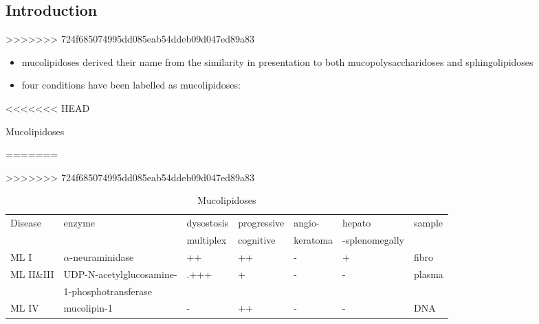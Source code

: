 \documentclass[fontsize=12pt]{scrartcl}
\begin{document}
\begin{enumerate}
\begin{enumerate}
\begin{enumerate}
\begin{enumerate}
\begin{table}[htbp]
\begin{enumerate}
\begin{enumerate}
\begin{enumerate}
\begin{enumerate}
\subsection{Introduction}
\label{sec:org13ec7d0}
>>>>>>> 724f685074995dd085eab54ddeb09d047ed89a83
\begin{itemize}
\item mucolipidoses derived their name from the similarity in
presentation to both mucopolysaccharidoses and sphingolipidoses
\item four conditions have been labelled as mucolipidoses:
\end{itemize}

\begin{table}[htbp]
<<<<<<< HEAD
\caption{\label{tab:org19ff6d4}Mucolipidoses}
=======
\caption{\label{tab:org76f8d5f}
Mucolipidoses}
>>>>>>> 724f685074995dd085eab54ddeb09d047ed89a83
\centering
\begin{tabular}{lllllll}
Disease & enzyme & dysostosis & progressive & angio- & hepato & sample\\
 &  & multiplex & cognitive & keratoma & -splenomegally & \\
\hline
ML I & \(\alpha\)-neuraminidase & ++ & ++ & - & + & fibro\\
ML II\&III & UDP-N-acetylglucosamine- & .+++ & + & - & - & plasma\\
 & 1-phosphotransferase &  &  &  &  & \\
ML IV & mucolipin-1 & - & ++ & - & - & DNA\\
\end{tabular}
\end{table}


\end{enumerate}
\end{enumerate}
\end{enumerate}
\end{enumerate}
\end{table}
\end{enumerate}
\end{enumerate}
\end{enumerate}
\end{enumerate}
\end{document}
